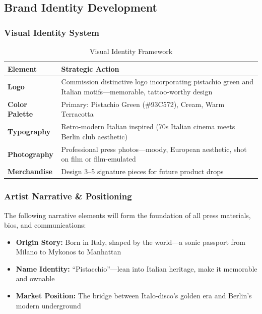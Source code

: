 \documentclass[11pt,a4paper]{article}
\begin{document}
\subsection{Brand Identity Development}

\subsubsection{Visual Identity System}

\begin{table}[h!]
\centering
\renewcommand{\arraystretch}{1.4}
\begin{tabularx}{\textwidth}{>{\bfseries}l X}
\toprule
\rowcolor{amaraprimary}
\textcolor{amaracream}{\textbf{Element}} & \textcolor{amaracream}{\textbf{Strategic Action}} \\
\midrule
Logo & Commission distinctive logo incorporating pistachio green and Italian motifs---memorable, tattoo-worthy design \\
Color Palette & Primary: Pistachio Green (\#93C572), Cream, Warm Terracotta \\
Typography & Retro-modern Italian inspired (70s Italian cinema meets Berlin club aesthetic) \\
Photography & Professional press photos---moody, European aesthetic, shot on film or film-emulated \\
Merchandise & Design 3--5 signature pieces for future product drops \\
\bottomrule
\end{tabularx}
\caption{Visual Identity Framework}
\end{table}

\subsubsection{Artist Narrative \& Positioning}

The following narrative elements will form the foundation of all press materials, bios, and communications:

\begin{itemize}[leftmargin=*]
    \item \textbf{Origin Story:} Born in Italy, shaped by the world---a sonic passport from Milano to Mykonos to Manhattan
    \item \textbf{Name Identity:} ``Pistacchio''---lean into Italian heritage, make it memorable and ownable
    \item \textbf{Market Position:} The bridge between Italo-disco's golden era and Berlin's modern underground
\end{itemize}
\end{document}
